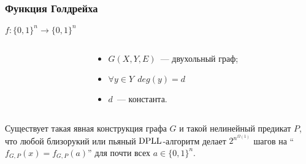 \begin{frame}
	\frametitle{Функция Голдрейха}
	$f:\{0, 1\}^n \rightarrow \{0, 1\}^n$

    \pause

    \begin{columns}
    	\begin{column}{5.5cm}
            
        \end{column}

        \pause
        \pause
        \begin{column}{5.5cm}
            \begin{itemize}
	            \item $G(X, Y, E)$~--- двухольный граф;
            	\pause
                \item $\forall y \in Y ~~ deg(y) = d$
            	\pause
            	\item $d$~--- константа.
            \end{itemize}
        \end{column}
	\end{columns}
    

    \pause
    \begin{theorem}
		Существует такая \alert{явная} конструкция графа $G$ и такой нелинейный предикат $P$, что любой близорукий или пьяный
        $\mathrm{DPLL}$-алгоритм делает $2^{n^{\Omega(1)}}$ шагов на ``$f_{G, P}(x) = f_{G, P}(a)$'' для почти всех $a \in \{0, 1\}^n$.
	\end{theorem}
\end{frame}